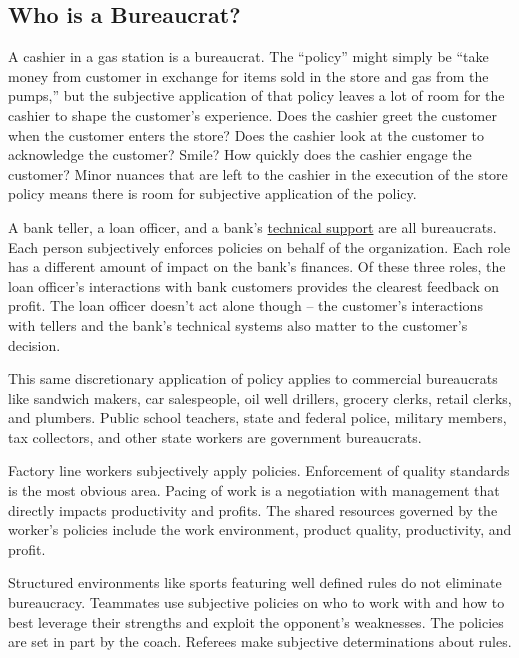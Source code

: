 \subsection{Who is a Bureaucrat?}

A cashier in a gas station is a bureaucrat. The ``policy'' might simply be ``take money from customer in exchange for items sold in the store and gas from the pumps,'' but the subjective application of that policy leaves a lot of room for the cashier to shape the customer's experience. Does the cashier greet the customer when the customer enters the store? Does the cashier look at the customer to acknowledge the customer? Smile? How quickly does the cashier engage the customer? Minor nuances that are left to the cashier in the execution of the store policy means there is room for subjective application of the policy. 

A bank teller, a loan officer, and a bank's \href{https://en.wikipedia.org/wiki/Technical_support}{technical support} are all bureaucrats. Each person subjectively enforces policies on behalf of the organization. Each role has a different amount of impact on the bank's finances. Of these three roles, the loan officer's interactions with bank customers provides the clearest feedback on profit. The loan officer doesn't act alone though -- the customer's interactions with tellers and the bank's technical systems also matter to the customer's decision. 


This same discretionary application of policy applies to commercial bureaucrats like sandwich makers, car salespeople, oil well drillers, grocery clerks, retail clerks, and plumbers. Public school teachers, state and federal police, military members, tax collectors, and other state workers are government bureaucrats. 


Factory line workers subjectively apply policies. Enforcement of quality standards is the most obvious area. Pacing of work is a negotiation with management that directly impacts productivity and profits. The shared resources governed by the worker's policies include the work environment, product quality, productivity, and profit.

Structured environments like sports featuring well defined rules do not eliminate bureaucracy. Teammates use subjective policies on who to work with and how to best leverage their strengths and exploit the opponent's weaknesses. The policies are set in part by the coach. Referees make subjective determinations about rules.

